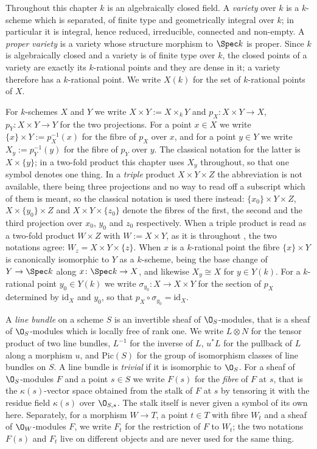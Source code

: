 Throughout this chapter $k$ is an algebraically closed field.  A
\emph{variety} over $k$ is a $k$-scheme which is separated, of finite type and
geometrically integral over $k$; in particular it is integral, hence reduced,
irreducible, connected and non-empty.  A \emph{proper variety} is a variety
whose structure morphism to $\Spec k$ is proper.  Since $k$ is algebraically
closed and a variety is of finite type over $k$, the closed points of a
variety are exactly its $k$-rational points and they are dense in it; a
variety therefore has a $k$-rational point.  We write $X(k)$ for the set of
$k$-rational points of $X$.

For $k$-schemes $X$ and $Y$ we write $X\times Y:=X\times_kY$ and
$p_X\colon X\times Y\to X$, $p_Y\colon X\times Y\to Y$ for the two
projections.  For a point $x\in X$ we write $\{x\}\times Y:=p_X^{-1}(x)$ for
the fibre of $p_X$ over $x$, and for a point $y\in Y$ we write
$X_y:=p_Y^{-1}(y)$ for the fibre of $p_Y$ over $y$.  The classical notation
for the latter is $X\times\{y\}$; in a two-fold product this chapter uses
$X_y$ throughout, so that one symbol denotes one thing.  In a \emph{triple}
product $X\times Y\times Z$ the abbreviation is not available, there being
three projections and no way to read off a subscript which of them is meant,
so the classical notation is used there instead: $\{x_0\}\times Y\times Z$,
$X\times\{y_0\}\times Z$ and $X\times Y\times\{z_0\}$ denote the fibres of
the first, the second and the third projection over $x_0$, $y_0$ and $z_0$
respectively.  When a triple product is read as a two-fold product
$W\times Z$ with $W:=X\times Y$, as it is throughout ,
the two notations agree: $W_z=X\times Y\times\{z\}$.  When $x$ is a
$k$-rational point the fibre
$\{x\}\times Y$ is canonically isomorphic to $Y$ as a $k$-scheme, being the
base change of $Y\to\Spec k$ along $x\colon\Spec k\to X$, and likewise
$X_y\cong X$ for $y\in Y(k)$.  For a $k$-rational point
$y_0\in Y(k)$ we write $\sigma_{y_0}\colon X\to X\times Y$ for the section of
$p_X$ determined by $\mathrm{id}_X$ and $y_0$, so that
$p_X\circ\sigma_{y_0}=\mathrm{id}_X$.

A \emph{line bundle} on a scheme $S$ is an invertible sheaf of
$\O_S$-modules, that is a sheaf of $\O_S$-modules which is locally free of
rank one.  We write $L\otimes N$ for the tensor product of two line bundles,
$L^{-1}$ for the inverse of $L$, $u^*L$ for the pullback of $L$ along a
morphism $u$, and $\mathrm{Pic}(S)$ for the group of isomorphism classes of
line bundles on $S$.  A line bundle is \emph{trivial} if it is isomorphic to
$\O_S$.  For a sheaf of $\O_S$-modules $F$ and a point $s\in S$ we write
$F(s)$ for the \emph{fibre} of $F$ at $s$, that is the $\kappa(s)$-vector
space obtained from the stalk of $F$ at $s$ by tensoring it with the residue
field $\kappa(s)$ over $\O_{S,s}$.  The stalk itself is never given a symbol
of its own here.  Separately, for a morphism $W\to T$, a point $t\in T$ with
fibre $W_t$ and a sheaf of $\O_W$-modules $F$, we write $F_t$ for the
restriction of $F$ to $W_t$; the two notations $F(s)$ and $F_t$ live on
different objects and are never used for the same thing.

